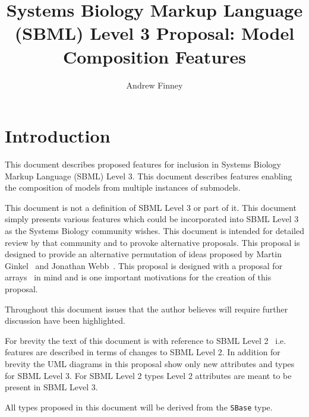 \documentclass{cekarticle}
\begin{document}

\title{Systems Biology Markup Language (SBML) Level 3 Proposal: Model Composition Features}

\author{Andrew Finney}


\maketitlepage

\section{Introduction}
\label{sec:introduction}

This document describes proposed features for inclusion in
Systems Biology Markup Language (SBML) Level 3. This document
describes features enabling the composition of models from multiple instances of submodels.  

This document is not a definition of SBML Level 3 or part of it.
This document simply presents various features which could be
incorporated into SBML Level 3 as the Systems Biology community
wishes.  This document is intended for detailed review by that
community and to provoke alternative proposals.  
This proposal is designed to provide an alternative permutation of ideas
proposed by Martin Ginkel~\citep{ginkel:2002} and Jonathan Webb~\citep{webb:2003}.
This proposal is designed with a proposal for arrays~\citep{finney:2003} in mind
and is one important motivations for the creation of this proposal.

Throughout this
document issues that the author believes will require further
discussion have been highlighted.

For brevity the text of this document is with reference to SBML
Level 2~\citep{finney:2002f} i.e. features are described in terms
of changes to SBML Level 2.  In addition for brevity the UML diagrams in this proposal
show only new attributes and types for SBML Level 3.  For SBML Level 2 types Level 2
attributes are meant to be present in SBML Level 3.

All types proposed in this document will be derived from the
\texttt{SBase} type.
\end{document}
